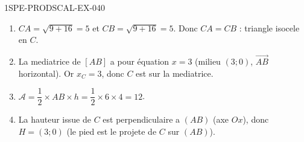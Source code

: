 \begin{corrige}{1SPE-PRODSCAL-EX-040}
\begin{enumerate}
\item $CA = \sqrt{9 + 16} = 5$ et $CB = \sqrt{9 + 16} = 5$. Donc $CA = CB$ : triangle isocele en $C$.
\item La mediatrice de $[AB]$ a pour équation $x = 3$ (milieu $(3;0)$, $\overrightarrow{AB}$ horizontal). Or $x_C = 3$, donc $C$ est sur la mediatrice.
\item $\mathcal{A} = \dfrac{1}{2} \times AB \times h = \dfrac{1}{2} \times 6 \times 4 = 12$.
\item La hauteur issue de $C$ est perpendiculaire a $(AB)$ (axe $Ox$), donc $H = (3; 0)$ (le pied est le projete de $C$ sur $(AB)$).
\end{enumerate}
\end{corrige}
